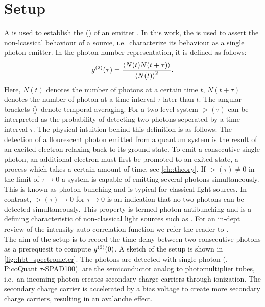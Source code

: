 	\section[HBT]{\HBT Setup}\label{sec::methods_hbt}

		A  is used to establish the  () of an emitter \cite{janine::240, janine::241}.
		In this work, the \gtf is used to assert the non-lcassical behaviour of a \pl source, \i.e.\ characterize its behaviour as a single photon emitter.
		In the photon number representation, it is defined as follows:
		\[
		g^{(2)}(\tau) = \frac{ \left\langle  N(t) N(t+\tau) \right\rangle }{\left\langle N(t)\right\rangle^2}.
		\]
		Here, $N(t)$ denotes the number of photons at a certain time $t$, $N(t+\tau)$ denotes the number of photon at a time interval $\tau$ later than $t$.
		The angular brackets $\left\langle \right\rangle$ denote temporal averaging.
		For a two-level system $\gt(\tau)$ can be interpreted as the probability of detecting two photons seperated by a time interval $\tau$.
		The physical intuition behind this definition is as follows: The detection of a flourescent photon emitted from a quantum system is the result of an excited electron relaxing back to its ground state. To emit a consecutive single photon, an additional electron must first be promoted to an exited state, a process which takes a certain amount of time, see \autoref{ch::theory}. If $\gt(\tau) \neq 0$ in the limit of $\tau \to 0$ a system is capable of emitting several photons simultaneously. This is known as photon bunching and is typical for classical light sources. In contrast, $\gt(\tau) \to 0$ for $\tau \to 0$ is an indication that no two photons can be detected simultaneously. This property is termed photon antibunching and is a defining characteristic of non-classical light sources such as \sps. For an in-dept review of the intensity auto-correlation function we refer the reader to \cite{neu::thesis, Fox2006}.
		\\
		The aim of the \hbt setup is to record the time delay between two consecutive photons as a prerequesit to compute $g^{(2)}(0)$.
		A sketch of the \hbt setup is shown in \autoref{fig::hbt_spectrometer}.
		The photons are detected with single photon \apds (\APDs, PicoQuant $\tau${}-SPAD100).
		\APDs are the semiconductor analog to photomultiplier tubes, i.e.\ an incoming photon creates secondary charge carriers through ionization.
		The secondary charge carrier is accelerated by a bias voltage to create more secondary charge carriers, resulting in an avalanche effect.
